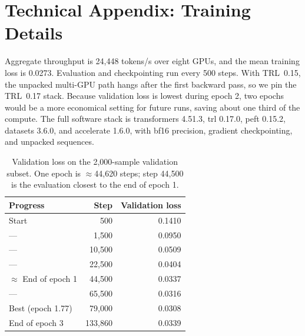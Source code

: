 \section{Technical Appendix: Training Details}
\label{app:training}
Aggregate throughput is 24,448 tokens/s over eight GPUs, and the mean training loss is 0.0273. Evaluation and checkpointing run every 500 steps. With TRL~0.15, the unpacked multi-GPU path hangs after the first backward pass, so we pin the TRL~0.17 stack. Because validation loss is lowest during epoch 2, two epochs would be a more economical setting for future runs, saving about one third of the compute. The full software stack is transformers 4.51.3, trl 0.17.0, peft 0.15.2, datasets 3.6.0, and accelerate 1.6.0, with bf16 precision, gradient checkpointing, and unpacked sequences.

\begin{table}[!htbp]
\centering
\small
\begin{tabular}{lrr}
\toprule
Progress & Step & Validation loss \\
\midrule
Start & 500 & 0.1410 \\
--- & 1,500 & 0.0950 \\
--- & 10,500 & 0.0509 \\
--- & 22,500 & 0.0404 \\
$\approx$ End of epoch 1 & 44,500 & 0.0337 \\
--- & 65,500 & 0.0316 \\
Best (epoch 1.77) & 79,000 & 0.0308 \\
End of epoch 3 & 133,860 & 0.0339 \\
\bottomrule
\end{tabular}
\caption{Validation loss on the 2,000-sample validation subset. One epoch is $\approx$44,620 steps; step 44,500 is the evaluation closest to the end of epoch 1.}
\label{tab:eval-loss}
\end{table}


